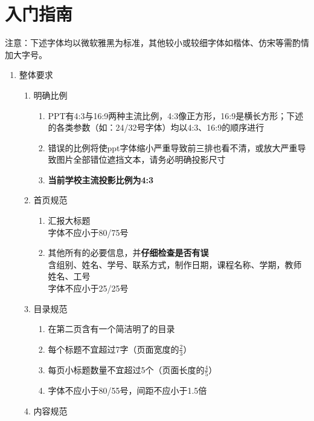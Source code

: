 \section[入门指南]{入门指南}
注意：下述字体均以微软雅黑为标准，其他较小或较细字体如楷体、仿宋等需酌情加大字号。
\begin{enumerate}
    \item 整体要求
          \begin{enumerate}
              \item 明确比例
                    \begin{enumerate}
                        \item PPT有4:3与16:9两种主流比例，4:3像正方形，16:9是横长方形；下述的各类参数（如：24/32号字体）均以4:3、16:9的顺序进行
                        \item 错误的比例将使ppt字体缩小严重导致前三排也看不清，或放大严重导致图片全部错位遮挡文本，请务必明确投影尺寸
                        \item \textbf{当前学校主流投影比例为4:3}
                    \end{enumerate}
              \item 首页规范
                    \begin{enumerate}
                        \item 汇报大标题\\
                              字体不应小于80/75号
                        \item 其他所有的必要信息，并\textbf{仔细检查是否有误}\\
                              含组别、姓名、学号、联系方式，制作日期，课程名称、学期，教师姓名、工号\\
                              字体不应小于25/25号
                    \end{enumerate}
              \item 目录规范
                    \begin{enumerate}
                        \item 在第二页含有一个简洁明了的目录
                        \item 每个标题不宜超过7字（页面宽度的$\frac{2}{3}$）
                        \item 每页小标题数量不宜超过5个（页面长度的$\frac{4}{5}$）
                        \item 字体不应小于80/55号，间距不应小于1.5倍
                    \end{enumerate}
              \item 内容规范

\end{enumerate}
\end{enumerate}

